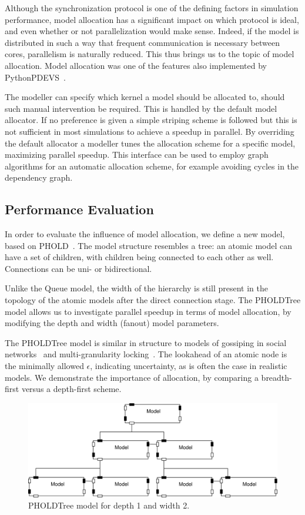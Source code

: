 Although the synchronization protocol is one of the defining factors in simulation performance, model allocation has a significant impact on which protocol is ideal, and even whether or not parallelization would make sense.
Indeed, if the model is distributed in such a way that frequent communication is necessary between cores, parallelism is naturally reduced.
This thus brings us to the topic of model allocation.
Model allocation was one of the features also implemented by PythonPDEVS~\cite{PythonPDEVS2}.

The modeller can specify which kernel a model should be allocated to, should such manual intervention be required.
This is handled by the default model allocator.
If no preference is given a simple striping scheme is followed but this is not sufficient in most simulations to achieve a speedup in parallel.
By overriding the default allocator a modeller tunes the allocation scheme for a specific model, maximizing parallel speedup.
This interface can be used to employ graph algorithms for an automatic allocation scheme, for example avoiding cycles in the dependency graph.

\subsection{Performance Evaluation}
In order to evaluate the influence of model allocation, we define a new model, based on PHOLD~\cite{PHOLD}.
The model structure resembles a tree: an atomic model can have a set of children, with children being connected to each other as well.
Connections can be uni- or bidirectional.

Unlike the Queue model, the width of the hierarchy is still present in the topology of the atomic models after the direct connection stage.
The PHOLDTree model allows us to investigate parallel speedup in terms of model allocation, by modifying the depth and width (fanout) model parameters.

The PHOLDTree model is similar in structure to models of gossiping in social networks~\cite{Gossip} and multi-granularity locking~\cite{MultiGranularityLocking}.
The lookahead of an atomic node is the minimally allowed $\epsilon$, indicating uncertainty, as is often the case in realistic models.
We demonstrate the importance of allocation, by comparing a breadth-first versus a depth-first scheme.

\begin{figure}
    \center
    \includegraphics[width=\columnwidth]{fig/pholdtree.pdf}
    \caption{PHOLDTree model for depth 1 and width 2.}
    \label{fig:PHOLDTree_model}
\end{figure}

